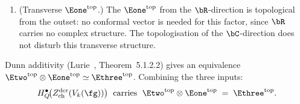 \begin{proposition}
\begin{enumerate}[label=\textup{(\roman*)}]
\item \textup{(Transverse $\Eone^{\mathrm{top}}$.)}
 The $\Eone^{\mathrm{top}}$ from the $\bR$-direction is
 topological from the outset: no conformal vector is needed for
 this factor, since $\bR$ carries no complex structure. The
 topologisation of the $\bC$-direction does not disturb this
 transverse structure.
\end{enumerate}
Dunn additivity \textup{(}Lurie~\cite{HA},
Theorem~5.1.2.2\textup{)} gives an equivalence
$\Etwo^{\mathrm{top}} \otimes \Eone^{\mathrm{top}} \simeq
\Ethree^{\mathrm{top}}$.
Combining the three inputs:
\begin{equation}\label{eq:e3-via-dunn}
H_Q^\bullet\!\bigl(Z^{\mathrm{der}}_{\mathrm{ch}}(V_k(\fg))\bigr)
\;\text{ carries }\;
\Etwo^{\mathrm{top}} \otimes \Eone^{\mathrm{top}}
\;=\; \Ethree^{\mathrm{top}}.
\end{equation}
\end{proposition}

